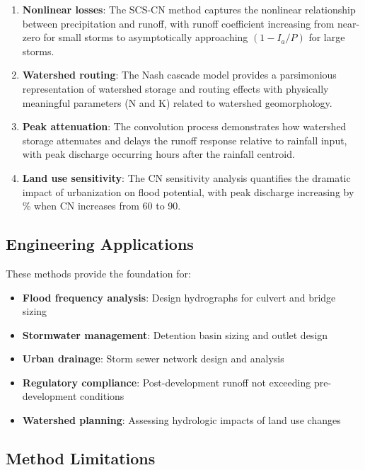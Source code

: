 \documentclass[a4paper, 11pt]{article}
\begin{document}
\begin{enumerate}
\item \textbf{Nonlinear losses}: The SCS-CN method captures the nonlinear relationship
between precipitation and runoff, with runoff coefficient increasing from near-zero for
small storms to asymptotically approaching $(1 - I_a/P)$ for large storms.

\item \textbf{Watershed routing}: The Nash cascade model provides a parsimonious representation
of watershed storage and routing effects with physically meaningful parameters (N and K)
related to watershed geomorphology.

\item \textbf{Peak attenuation}: The convolution process demonstrates how watershed storage
attenuates and delays the runoff response relative to rainfall input, with peak discharge
occurring  hours after the rainfall centroid.

\item \textbf{Land use sensitivity}: The CN sensitivity analysis quantifies the dramatic
impact of urbanization on flood potential, with peak discharge increasing by
\% when CN increases from 60 to 90.
\end{enumerate}

\subsection{Engineering Applications}

These methods provide the foundation for:

\begin{itemize}
\item \textbf{Flood frequency analysis}: Design hydrographs for culvert and bridge sizing
\item \textbf{Stormwater management}: Detention basin sizing and outlet design
\item \textbf{Urban drainage}: Storm sewer network design and analysis
\item \textbf{Regulatory compliance}: Post-development runoff not exceeding pre-development conditions
\item \textbf{Watershed planning}: Assessing hydrologic impacts of land use changes
\end{itemize}

\subsection{Method Limitations}
\end{document}
